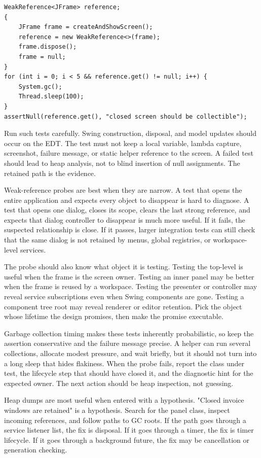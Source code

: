 \begin{lstlisting}[caption={A lightweight screen collectability probe.}]
WeakReference<JFrame> reference;
{
    JFrame frame = createAndShowScreen();
    reference = new WeakReference<>(frame);
    frame.dispose();
    frame = null;
}
for (int i = 0; i < 5 && reference.get() != null; i++) {
    System.gc();
    Thread.sleep(100);
}
assertNull(reference.get(), "closed screen should be collectible");
\end{lstlisting}

Run such tests carefully. Swing construction, disposal, and model updates should occur on the EDT. The test must not keep a local variable, lambda capture, screenshot, failure message, or static helper reference to the screen. A failed test should lead to heap analysis, not to blind insertion of null assignments. The retained path is the evidence.

Weak-reference probes are best when they are narrow. A test that opens the entire application and expects every object to disappear is hard to diagnose. A test that opens one dialog, closes its scope, clears the last strong reference, and expects that dialog controller to disappear is much more useful. If it fails, the suspected relationship is close. If it passes, larger integration tests can still check that the same dialog is not retained by menus, global registries, or workspace-level services.

The probe should also know what object it is testing. Testing the top-level  is useful when the frame is the screen owner. Testing an inner panel may be better when the frame is reused by a workspace. Testing the presenter or controller may reveal service subscriptions even when Swing components are gone. Testing a component tree root may reveal renderer or editor retention. Pick the object whose lifetime the design promises, then make the promise executable.

Garbage collection timing makes these tests inherently probabilistic, so keep the assertion conservative and the failure message precise. A helper can run several collections, allocate modest pressure, and wait briefly, but it should not turn into a long sleep that hides flakiness. When the probe fails, report the class under test, the lifecycle step that should have closed it, and the diagnostic hint for the expected owner. The next action should be heap inspection, not guessing.

Heap dumps are most useful when entered with a hypothesis. "Closed invoice windows are retained" is a hypothesis. Search for the panel class, inspect incoming references, and follow paths to GC roots. If the path goes through a service listener list, the fix is disposal. If it goes through a timer, the fix is timer lifecycle. If it goes through a background future, the fix may be cancellation or generation checking.

